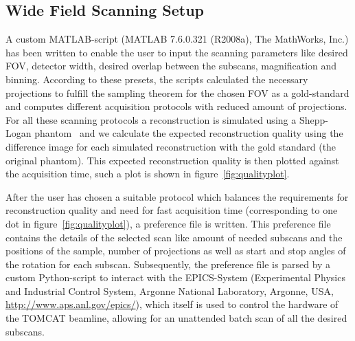 \subsection{Wide Field Scanning Setup}
\label{subsec:wfs-setup}%
\cbstart
A custom MATLAB-script (MATLAB\textsuperscript{\textregistered} 7.6.0.321 (R2008a), The MathWorks, Inc.) has been written to enable the user to input the scanning parameters like desired FOV, detector width, desired overlap between the subscans, magnification and binning. According to these presets, the scripts calculated the necessary projections to fulfill the sampling theorem for the chosen FOV as a gold-standard and computes different acquisition protocols with reduced amount of projections. For all these scanning protocols a reconstruction is simulated using a Shepp-Logan phantom~\cite{Shepp1974} and we calculate the expected reconstruction quality using the difference image for each simulated reconstruction with the gold standard (the original phantom). This expected reconstruction quality is then plotted against the acquisition time, such a plot is shown in figure~\ref{fig:qualityplot}.

After the user has chosen a suitable protocol which balances the requirements for reconstruction quality and need for fast acquisition time (corresponding to one dot in figure~\ref{fig:qualityplot}), a preference file is written. This preference file contains the details of the selected scan like amount of needed subscans and the positions of the sample, number of projections as well as start and stop angles of the rotation for each subscan. Subsequently, the preference file is parsed by a custom Python-script to interact with the EPICS-System (Experimental Physics and Industrial Control System, Argonne National Laboratory, Argonne, USA, \url{http://www.aps.anl.gov/epics/}), which itself is used to control the hardware of the TOMCAT beamline, allowing for an unattended batch scan of all the desired subscans.
\cbend

\begin{figure*}[htp]
	\centering%
	\caption{Quality-Plot of 19 calculated protocols. The red dots show the expected quality of the different protocols, the black plot is a polynomial fit $p(x)$ with $n=4$ for $p(x)=p_{1}x^{n}+p_{2}x^{n-1}+\cdots+p_{n}x+p_{n+1}$. Details of these scans are shown in table~\ref{tab:projections} and are discussed in section~\ref{sec:Results}.}%
	\label{fig:qualityplot}%
\end{figure*}

